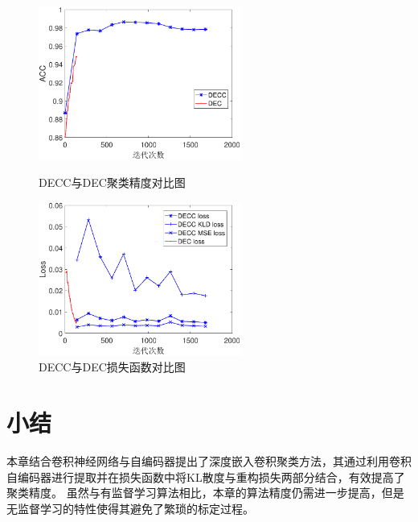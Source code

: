 \begin{figure}[hbt]
	\centering
	\begin{minipage}{7cm}
		\includegraphics[width=6.67cm]{figures/ae/unsurpvised_acc}
    \caption{DECC与DEC聚类精度对比图}
    \label{fig:unsurpvised_acc}

	\end{minipage}
	\hspace{10pt}
	\begin{minipage}{7cm}
		\includegraphics[width=6.67cm]{figures/ae/unsurpvised_loss}
    \caption{DECC与DEC损失函数对比图}
    \label{fig:unsurpvised_loss}

	\end{minipage}

\end{figure}

\section{小结}
\label{sec:decc_summary}
本章结合卷积神经网络与自编码器提出了深度嵌入卷积聚类方法，其通过利用卷积自编码器进行提取并在损失函数中将KL散度与重构损失两部分结合，有效提高了聚类精度。
虽然与有监督学习算法相比，本章的算法精度仍需进一步提高，但是无监督学习的特性使得其避免了繁琐的标定过程。
